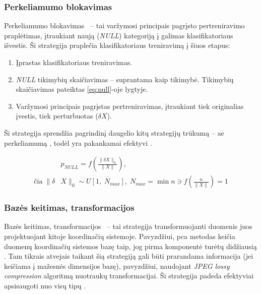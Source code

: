 \def\strat{Perkeliamumo blokavimas}
\subsubsection{\strat}

\strat~ -- tai varžymosi principais pagrįsto pertreniravimo  praplėtimas, įtraukiant naują (\textit{NULL}) kategoriją į galimas klasifikatoriaus išvestis. Ši strategija praplečia klasifikatoriaus treniravimą į šiuos etapus:
\begin{enumerate}
    \item Įprastas klasifikatoriaus treniravimas.
    \item \textit{NULL} tikimybių skaičiavimas -- suprantama kaip  tikimybė. Tikimybių skaičiavimas pateiktas \ref{eq:null}-oje lygtyje.
    \item Varžymosi principais pagrįstas pertreniravimas, įtraukiant tiek originalias įvestis, tiek perturbuotas ($\delta X$).
\end{enumerate}

Ši strategija sprendžia pagrindinį daugelio kitų strategijų trūkumą -- \gls{ae} perkeliamumą , todėl yra pakankamai efektyvi \cite{chakrabortySurveyAdversarialAttacks2021}.

\begin{equation}\label{eq:null}
    \begin{split}
        &p_{NULL} = f\left(\frac{\| \delta X \|_0}{\|X\|}\right),\\
        \text{čia}\; \| \delta
        &X \|_0 \sim U[1,\; N_{max}], \; N_{max} = \min n \ni f\left(\frac{n}{\|X\|}\right)
        = 1
    \end{split}
\end{equation}



\def\strat{Bazės keitimas, transformacijos}
\subsubsection{\strat}

\strat~ -- tai strategija transformuojanti duomenis juos projektuojant kitoje koordinačių sistemoje. Pavyzdžiui, \gls{pca} metodas keičia duomenų koordinačių sistemos bazę taip, jog pirma komponentė turėtų didžiausią . Tam tikrais atvejais taikant šią strategiją gali būti prarandama informacija (jei keičiama į mažesnės dimensijos bazę), pavyzdžiui, naudojant \textit{JPEG lossy compression} algoritmą nuotraukų transformacijai. Ši strategija padeda efektyviai apsisaugoti nuo visų tipų  \cite{chakrabortySurveyAdversarialAttacks2021}.